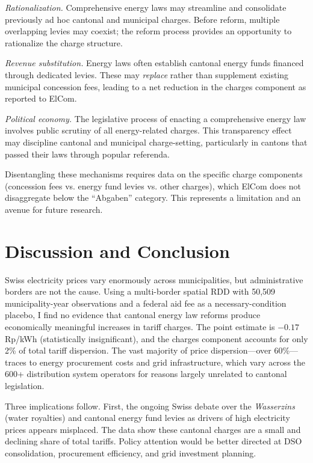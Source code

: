 \documentclass[12pt]{article}
\begin{document}
\textit{Rationalization.} Comprehensive energy laws may streamline and consolidate previously ad hoc cantonal and municipal charges. Before reform, multiple overlapping levies may coexist; the reform process provides an opportunity to rationalize the charge structure.

\textit{Revenue substitution.} Energy laws often establish cantonal energy funds financed through dedicated levies. These may \textit{replace} rather than supplement existing municipal concession fees, leading to a net reduction in the charges component as reported to ElCom.

\textit{Political economy.} The legislative process of enacting a comprehensive energy law involves public scrutiny of all energy-related charges. This transparency effect may discipline cantonal and municipal charge-setting, particularly in cantons that passed their laws through popular referenda.

Disentangling these mechanisms requires data on the specific charge components (concession fees vs. energy fund levies vs. other charges), which ElCom does not disaggregate below the ``Abgaben'' category. This represents a limitation and an avenue for future research.


\section{Discussion and Conclusion}

Swiss electricity prices vary enormously across municipalities, but administrative borders are not the cause. Using a multi-border spatial RDD with 50,509 municipality-year observations and a federal aid fee as a necessary-condition placebo, I find no evidence that cantonal energy law reforms produce economically meaningful increases in tariff charges. The point estimate is $-0.17$ Rp/kWh (statistically insignificant), and the charges component accounts for only 2\% of total tariff dispersion. The vast majority of price dispersion---over 60\%---traces to energy procurement costs and grid infrastructure, which vary across the 600+ distribution system operators for reasons largely unrelated to cantonal legislation.

Three implications follow. First, the ongoing Swiss debate over the \textit{Wasserzins} (water royalties) and cantonal energy fund levies as drivers of high electricity prices appears misplaced. The data show these cantonal charges are a small and declining share of total tariffs. Policy attention would be better directed at DSO consolidation, procurement efficiency, and grid investment planning.
\end{document}
